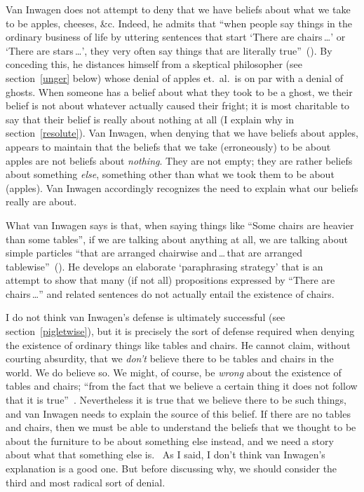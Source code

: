 \documentclass[11pt]{article}
\begin{document}
\begin{spacing}{1.5}
Van Inwagen does not attempt to deny that we have beliefs about what we take to be apples, cheeses, \&c. Indeed, he admits that ``when people say things in the ordinary business of life by uttering sentences that start `There are chairs\,\ldots ' or `There are stars\,\ldots ', they very often say things that are literally true''~(\citeyear[102]{inwagen1995}). By conceding this, he distances himself from a skeptical philosopher (see section~\ref{unger} below) whose denial of apples et.\ al.\ is on par with a denial of ghosts. When someone has a belief about what they took to be a ghost, we their belief is not about whatever actually caused their fright; it is most charitable to say that their belief is really about nothing at all (I explain why in section~\ref{resolute}). Van Inwagen, when denying that we have beliefs about apples, appears to maintain that the beliefs that we take (erroneously) to be about apples are not beliefs about {\em nothing}. They are not empty; they are rather beliefs about something {\em else}, something other than what we took them to be about (apples). Van Inwagen accordingly recognizes the need to explain what our beliefs really are about.

What van Inwagen says is that, when saying things like ``Some chairs are heavier than some tables'', if we are talking about anything at all, we are talking about simple particles ``that are arranged chairwise and\,\ldots\,that are arranged tablewise''~(\citeyear[109]{inwagen1995}). He develops an elaborate `paraphrasing strategy' that is an attempt to show that many (if not all) propositions expressed by ``There are chairs\,\ldots '' and related sentences do not actually entail the existence of chairs.

I do not think van Inwagen's defense is ultimately successful (see section~\ref{pigletwise}), but it is precisely the sort of defense required when denying the existence of ordinary things like tables and chairs. He cannot claim, without courting absurdity, that we {\em don't} believe there to be tables and chairs in the world. We do believe so. We might, of course, be {\em wrong} about the existence of tables and chairs; ``from the fact that we believe a certain thing it does not follow that it is true''~\citep[21]{stroud2000a}. Nevertheless it is true that we believe there to be such things, and van Inwagen needs to explain the source of this belief. If there are no tables and chairs, then we must be able to understand the beliefs that we thought to be about the furniture to be about something else instead, and we need a story about what that something else is.
\ As I said, I don't think van Inwagen's explanation is a good one. But before discussing why, we should consider the third and most radical sort of denial.


\end{spacing}
\end{document}
